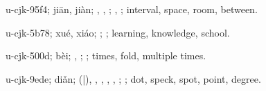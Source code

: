 \begin{multicols}{2}
{\cjkgGlue{}u-cjk-95f4; jiān, jiàn; \cjkgGlue{}, \cjkgGlue{}, \cjkgGlue{}; \cjkgGlue{}, \cjkgGlue{}; interval, space, room, between.

\cjkgGlue{}u-cjk-5b78; xué, xiáo; \cjkgGlue{}\cjkgGlue{}\cjkgGlue{}; \cjkgGlue{}; learning, knowledge, school.

\cjkgGlue{}u-cjk-500d; bèi; \cjkgGlue{}, \cjkgGlue{}; \cjkgGlue{}; times, fold, multiple times.

\cjkgGlue{}u-cjk-9ede; diǎn; \cjkgGlue{}\cjkgGlue{}(\cjkgGlue{}|\cjkgGlue{}), \cjkgGlue{}\cjkgGlue{}\cjkgGlue{}, \cjkgGlue{}\cjkgGlue{}\cjkgGlue{}, \cjkgGlue{}\cjkgGlue{}\cjkgGlue{}, \cjkgGlue{}\cjkgGlue{}\cjkgGlue{}, \cjkgGlue{}; \cjkgGlue{}; dot, speck, spot, point, degree.

}
\end{multicols}
